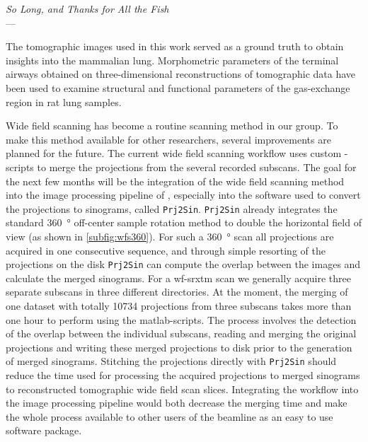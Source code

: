 \acresetall
{}\label{ch:outlook}
\begin{flushright}{\slshape
	So Long, and Thanks for All the Fish} \\ \medskip
	---  \citep{Adams1984}
\end{flushright}
\vspace{6cm}

The tomographic images used in this work served as a ground truth to obtain insights into the mammalian lung. Morphometric parameters of the terminal airways obtained on three-dimensional reconstructions of tomographic data have been used to examine structural and functional parameters of the gas-exchange region in rat lung samples.

Wide field scanning has become a routine scanning method in our group. To make this method available for other researchers, several improvements are planned for the future. The current wide field scanning workflow uses custom -scripts to merge the projections from the several recorded subscans. The goal for the next few months will be the integration of the wide field scanning method into the image processing pipeline of , especially into the software used to convert the projections to sinograms, called \texttt{Prj2Sin}. \texttt{Prj2Sin} already integrates the standard \SI{360}{\degree} off-center sample rotation method to double the horizontal field of view (as shown in \autoref{subfig:wfs360}). For such a \SI{360}{\degree} scan all projections are acquired in one consecutive sequence, and through simple resorting of the projections on the disk \texttt{Prj2Sin} can compute the overlap between the images and calculate the merged sinograms. For a \ac{wf-srxtm} scan we generally acquire three separate subscans in three different directories. At the moment, the merging of one dataset with totally \num{10734} projections from three subscans takes more than one hour to perform using the \ac{matlab}-scripts. The process involves the detection of the overlap between the individual subscans, reading and merging the original projections and writing these merged projections to disk prior to the generation of merged sinograms. Stitching the projections directly with \texttt{Prj2Sin} should reduce the time used for processing the acquired projections to merged sinograms to reconstructed tomographic wide field scan slices. Integrating the workflow into the image processing pipeline would both decrease the merging time and make the whole process available to other users of the beamline as an easy to use software package.

